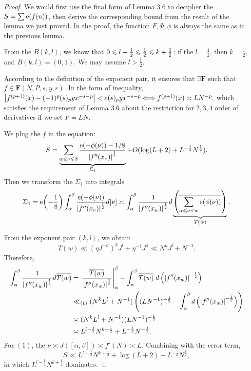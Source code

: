 \begin{proof}
We would first use the final form of Lemma 3.6 to decipher the $S = \sum \operatorname{e} \! \left( f(n) \right)$, then derive the corresponding bound from the result of the lemma we just proved. In the proof, the function $F, \Phi, \phi$ is always the same as in the previous lemma.

From the $B(k, l)$, we know that $0 \leqslant l-\frac{1}{2} \leqslant \frac{1}{2} \leqslant k+\frac{1}{2}$; if the $l = \frac{1}{2}$, then $k = \frac{1}{2}$, and $B(k,l) = (0,1)$. We may assume $l > \frac{1}{2}$.

According to the definition of the exponent pair, it ensures that $\exists \mathbf{F}$ such that $f \in \mathbf{F}(N, P, s, y, \varepsilon).$ In the form of inequality, $\left\lvert f^{(p+1)}(x) - (-1)^p (s)_p yx^{-s-p} \right\rvert < \varepsilon (s)_p yx^{-s-p} \Longleftrightarrow f^{(p+1)}(x) \asymp LN^{-p},$ which satisfies the requirement of Lemma 3.6 about the restriction for $2, 3, 4$ order of derivatives if we set $F = LN$.

We plug the $f$ in the equation:
\begin{equation}
    S = \underbrace{\sum_{\alpha \leqslant \nu \leqslant \beta} \frac{\operatorname{e} \! \left( -\phi(\nu) \right)-1/8}{\left\lvert f''(x_\nu) \right\rvert^\frac{1}{2}}}_{\Sigma_1} + O(\log(L+2) + L^{-\frac{1}{2}}N^\frac{1}{2}).
\end{equation}
Then we transform the $\Sigma_1$ into integrals 
\begin{equation}
    \Sigma_1 = \operatorname{e} \! \left( -\frac{1}{8} \right) \int_\alpha^\beta \frac{\operatorname{e} \! \left( -\phi(\nu) \right)}{\left\lvert f''(x_\nu) \right\rvert^\frac{1}{2}} d[\nu] \asymp \int_\alpha^\beta \frac{1}{\left\lvert f''(x_w) \right\rvert^\frac{1}{2}}d \underbrace{\left( \overline{\sum_{\alpha \leqslant \nu < w} \operatorname{e} \! \left( \phi(\nu) \right)} \right)}_{T(w)}.
\end{equation}

From the exponent pair $(k,l)$, we obtain $$T(w) \ll (\eta J^{-\sigma})^k J^l + \eta^{-1} J^\sigma \ll N^k J^l + N^{-1}.$$ Therefore, 
\begin{align}
    \int_\alpha^\beta \frac{1}{\left\lvert f''(x_w) \right\rvert^\frac{1}{2}} d \overline{T(w)} &= \left. \frac{\overline{T(w)}}{\left\lvert f''(x_w) \right\rvert^\frac{1}{2}} \right |_\alpha^\beta - \int_\alpha^\beta \overline{T(w)} \; d \left( \left\lvert f''(x_w) \right\rvert^{-\frac{1}{2}} \right) \\
    &\ll_{(1)} (N^k L^l + N^{-1}) \left( (LN^{-1})^{-\frac{1}{2}} - \int_\alpha^\beta d \left( \left\lvert f''(x_w) \right\rvert^{-\frac{1}{2}} \right) \right) \\
    &\asymp (N^k L^l + N^{-1}) (LN^{-1})^{-\frac{1}{2}} \\
    &\asymp L^{l-\frac{1}{2}} N^{k+\frac{1}{2}} + L^{-\frac{1}{2}} N^{-\frac{1}{2}}.
\end{align}
For $(1)$, the $\nu \asymp J([\alpha, \beta]) \asymp f'(N) \asymp L$. Combining with the error term, $$S \ll L^{l-\frac{1}{2}} N^{k+\frac{1}{2}} + \log(L+2) + L^{-\frac{1}{2}}N^\frac{1}{2},$$ in which $L^{l-\frac{1}{2}} N^{k+\frac{1}{2}}$ dominates.
\end{proof}
